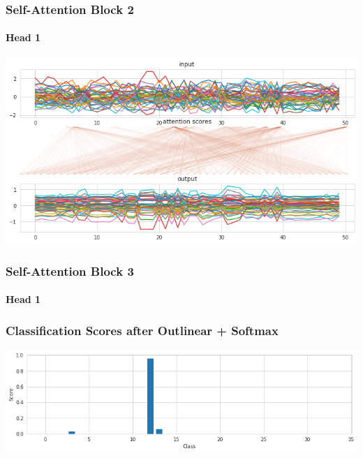 \begin{frame}
\frametitle{Self-Attention Block 2}
\framesubtitle{Head 1}
\centering\includegraphics[width=.85\textwidth]{images/self-attention/transformer/self-attention-2}
\end{frame}


\begin{frame}
\frametitle{Self-Attention Block 3}
\framesubtitle{Head 1}
\centering
{}
\end{frame}

\begin{frame}
\frametitle{Classification Scores after Outlinear + Softmax}
\includegraphics[width=.85\textwidth]{images/self-attention/transformer/outlinear}
\end{frame}
